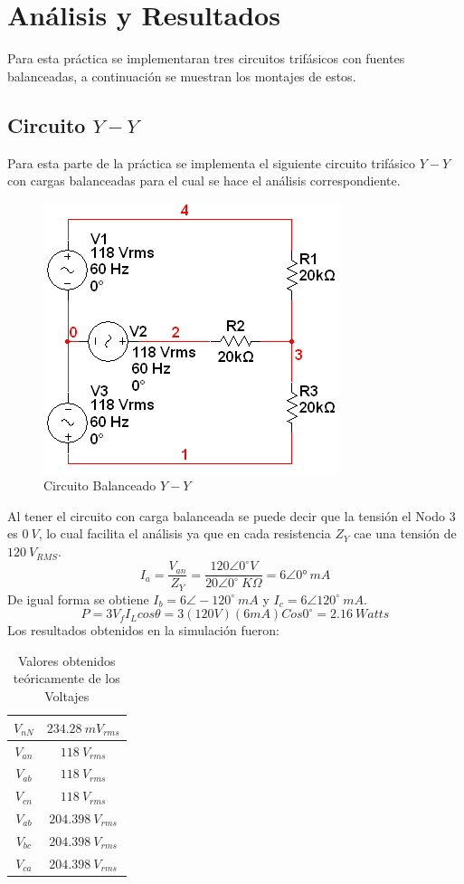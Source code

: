 \documentclass[twocolumn]{IEEEtran}
\begin{document}
\section{Análisis y Resultados}
\noindent
Para esta práctica se implementaran tres circuitos trifásicos con fuentes balanceadas, a continuación se muestran los montajes de estos.

\subsection{Circuito $Y-Y$}
\noindent
Para esta parte de la práctica se implementa el siguiente circuito trifásico $Y-Y$ con cargas balanceadas para el cual se hace el análisis correspondiente.
\begin{figure}[H]
	\centering
		\includegraphics[scale=0.7]{circYY.PNG}
	\caption{Circuito Balanceado $Y-Y$}
	\label{fig1}
\end{figure}
\noindent
Al tener el circuito con carga balanceada se puede decir que la tensión el Nodo $3$ es $0\ V$, lo cual facilita el análisis ya que en cada resistencia $Z_Y$ cae  una tensión de $120\ V_{RMS}$.
\begin{equation}
 {I_a} =\frac {V_{an}}{Z_Y} =\frac {120 \angle 0^\circ V}{ 20 \angle 0^\circ\ K \Omega}= 6\angle 0°\ mA
\label{ecu1}
\end{equation}
\noindent
De igual forma se obtiene  $I_b= 6\angle -120^\circ\ mA$ y $I_c= 6\angle 120^\circ \ mA$.
\begin{equation}
 P = 3  V_f  I_L  cos \theta = 3(120 V)(6 mA)Cos 0^\circ = 2.16\ Watts
\label{ecu2}
\end{equation}
\noindent
Los resultados obtenidos en la simulación fueron:
\begin{table}[H]
	\centering
\begin{tabular}[c]{|c|c|} \hline
$V_{nN}$ & $234.28 \ mV_{rms}$ \\ \hline
$V_{an}$ & $118 \ V_{rms}$ \\ \hline
$V_{ab}$ & $118 \ V_{rms}$ \\ \hline
$V_{cn}$ & $118 \ V_{rms}$ \\ \hline
$V_{ab}$ & $204.398 \ V_{rms}$ \\ \hline
$V_{bc}$ & $204.398 \ V_{rms}$ \\ \hline
$V_{ca}$ & $204.398 \ V_{rms}$ \\ \hline
\end{tabular}
	\caption{Valores obtenidos teóricamente  de los Voltajes}
	\label{tab10}
\end{table}
\end{document}
